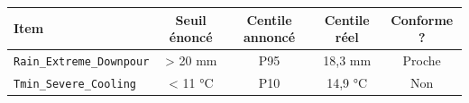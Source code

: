 \footnotesize
\begin{tabular}{lcccc}
\toprule
\rowcolor{NuitBleue!90}
\color{white}\textbf{Item} & \color{white}\textbf{Seuil énoncé} & \color{white}\textbf{Centile annoncé} & \color{white}\textbf{Centile réel} & \color{white}\textbf{Conforme ?} \\
\midrule
\texttt{Rain\_Extreme\_Downpour} & > 20 mm & P95 & 18,3 mm & Proche \\
\texttt{Tmin\_Severe\_Cooling} & < 11 °C & P10 & 14,9 °C & \textcolor{RougeL}{Non} \\
\bottomrule
\end{tabular}

